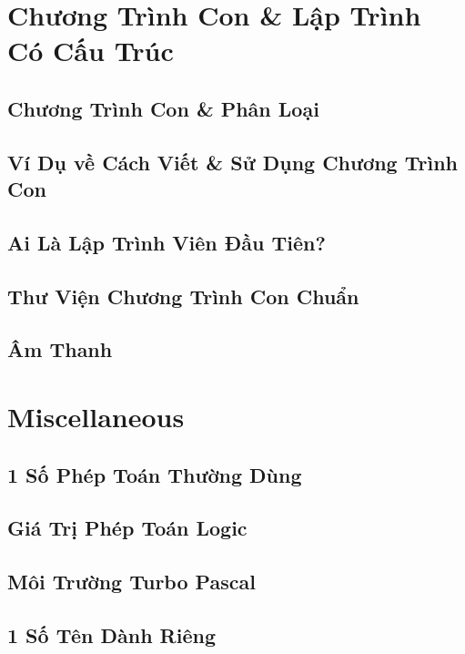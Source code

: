 \documentclass[oneside]{book}
\numberwithin{equation}{section}
\begin{document}
\chapter{Chương Trình Con \& Lập Trình Có Cấu Trúc}

\section{Chương Trình Con \& Phân Loại}

\section{Ví Dụ về Cách Viết \& Sử Dụng Chương Trình Con}

\section{Ai Là Lập Trình Viên Đầu Tiên?}

\section{Thư Viện Chương Trình Con Chuẩn}

\section{Âm Thanh}


\appendix

\chapter{Miscellaneous}

\section{1 Số Phép Toán Thường Dùng}

\section{Giá Trị Phép Toán Logic}

\section{Môi Trường Turbo Pascal}

\section{1 Số Tên Dành Riêng}
\end{document}
